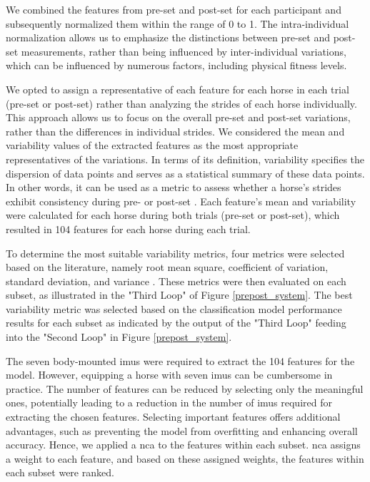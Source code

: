 


We combined the features from pre-\gls{set} and post-\gls{set} for each participant and subsequently normalized them within the range of 0 to 1. The intra-individual normalization allows us to emphasize the distinctions between pre-\gls{set} and post-\gls{set} measurements, rather than being influenced by inter-individual variations, which can be influenced by numerous factors, including physical fitness levels. 

We opted to assign a representative of each feature for each horse in each trial (pre-\gls{set} or post-\gls{set}) rather than analyzing the strides of each horse individually. This approach allows us to focus on the overall pre-\gls{set} and post-\gls{set} variations, rather than the differences in individual strides. We considered the mean and variability values of the extracted features as the most appropriate representatives of the variations. In terms of its definition, variability specifies the dispersion of data points and serves as a statistical summary of these data points. In other words, it can be used as a metric to assess whether a horse's strides exhibit consistency during pre- or post-\gls{set} \cite{wight,Nauwelaerts}.  Each feature's mean and variability were calculated for each horse during both trials (pre-\gls{set} or post-\gls{set}), which resulted in 104 features for each horse during each trial. 

To determine the most suitable variability metrics, four metrics were selected based on the literature, namely root mean square, coefficient of variation, standard deviation, and variance \cite{Nauwelaerts,wight,burdack,ESTEP2018111,s21144792}. These metrics were then evaluated on each subset, as illustrated in the "Third Loop" of Figure \ref{prepost_system}. The best variability metric was selected based on the classification model performance results for each subset as indicated by the output of the "Third Loop" feeding into the "Second Loop" in Figure \ref{prepost_system}.


The seven body-mounted \gls{imu}s were required to extract the 104 features for the model. However, equipping a horse with seven \gls{imu}s can be cumbersome in practice. The number of features can be reduced by selecting only the meaningful ones, potentially leading to a reduction in the number of \gls{imu}s required for extracting the chosen features. Selecting important features offers additional advantages, such as preventing the model from overfitting and enhancing overall accuracy. Hence, we applied a \gls{nca} \cite{10.5555/2976040.2976105} to the features within each subset. \gls{nca} assigns a weight to each feature, and based on these assigned weights, the features within each subset were ranked. 

